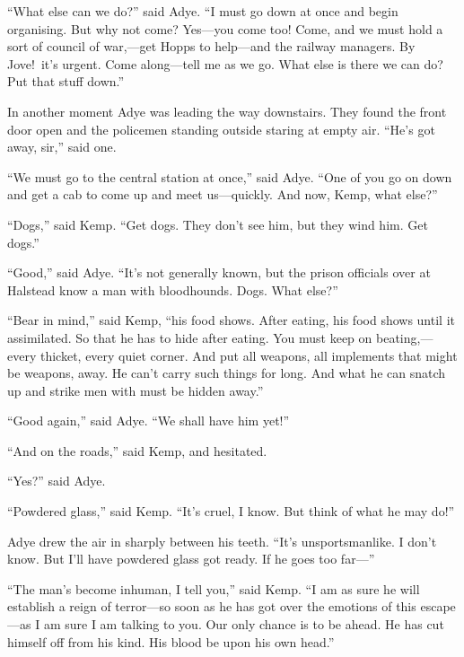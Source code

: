 “What else can we do?” said Adye. “I must go down at once and begin organising. But why not come? Yes—you come too! Come, and we must hold a sort of council of war,—get Hopps to help—and the railway managers. By Jove!\ it’s urgent. Come along—tell me as we go. What else is there we can do? Put that stuff down.”

In another moment Adye was leading the way downstairs. They found the front door open and the policemen standing outside staring at empty air. “He’s got away, sir,” said one.

“We must go to the central station at once,” said Adye. “One of you go on down and get a cab to come up and meet us—quickly. And now, Kemp, what else?”

“Dogs,” said Kemp. “Get dogs. They don’t see him, but they wind him. Get dogs.”

“Good,” said Adye. “It’s not generally known, but the prison officials over at Halstead know a man with bloodhounds. Dogs. What else?”

“Bear in mind,” said Kemp, “his food shows. After eating, his food shows until it assimilated. So that he has to hide after eating. You must keep on beating,—every thicket, every quiet corner. And put all weapons, all implements that might be weapons, away. He can’t carry such things for long. And what he can snatch up and strike men with must be hidden away.”

“Good again,” said Adye. “We shall have him yet!”

“And on the roads,” said Kemp, and hesitated.

“Yes?” said Adye.

“Powdered glass,” said Kemp. “It’s cruel, I know. But think of what he may do!”

Adye drew the air in sharply between his teeth. “It’s unsportsmanlike. I don’t know. But I’ll have powdered glass got ready. If he goes too far—”

“The man’s become inhuman, I tell you,” said Kemp. “I am as sure he will establish a reign of terror—so soon as he has got over the emotions of this escape—as I am sure I am talking to you. Our only chance is to be ahead. He has cut himself off from his kind. His blood be upon his own head.”